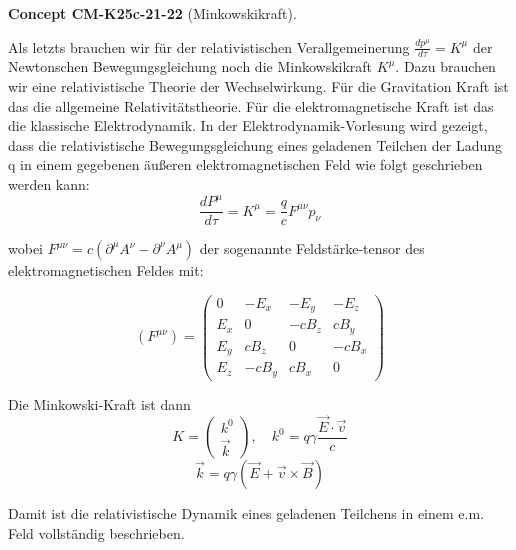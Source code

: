 \documentclass[10pt, letterpaper]{article}
\newcommand{\CustomHeading}[3]{%
  \par\medskip\noindent%
  \textbf{#1 #2} \textnormal{(#3)}.\enskip%
}
\newenvironment{CONC}[2]{\begin{unitbox}\CustomHeading{Concept}{#1}{#2}}{\end{unitbox}}
\begin{document}
\begin{CONC}{CM-K25c-21-22}{Minkowskikraft}
Als letzts brauchen wir für der relativistischen Verallgemeinerung $\frac{dp^\mu}{d\tau} = K^\mu$ der Newtonschen Bewegungsgleichung noch die Minkowskikraft $K^\mu$. Dazu brauchen wir eine relativistische Theorie der Wechselwirkung. Für die Gravitation Kraft ist das die allgemeine Relativitätstheorie. Für die elektromagnetische Kraft ist das die klassische Elektrodynamik. In der Elektrodynamik-Vorlesung wird gezeigt, dass die relativistische Bewegungsgleichung eines geladenen Teilchen der Ladung q in einem gegebenen äußeren elektromagnetischen Feld wie folgt geschrieben werden kann:
\[\frac{dP^\mu}{d\tau} = K^\mu = \frac{q}{c}F^{\mu\nu}p_\nu\]

wobei $F^{\mu\nu} = c(\partial^\mu A^\nu - \partial^\nu A^\mu)$ der sogenannte Feldstärke-tensor des elektromagnetischen Feldes mit:

\[(F^{\mu\nu}) = \begin{pmatrix}
0 & -E_x & -E_y & -E_z \\
E_x & 0 & -cB_z & cB_y \\
E_y & cB_z & 0 & -cB_x \\
E_z & -cB_y & cB_x & 0
\end{pmatrix}\]

Die Minkowski-Kraft ist dann
\[K = \begin{pmatrix} k^0 \\ \vec{k} \end{pmatrix}, \quad k^0 = q\gamma \frac{\vec{E}\cdot\vec{v}}{c}\]
\[\vec{k} = q\gamma(\vec{E} + \vec{v}\times\vec{B})\]

Damit ist die relativistische Dynamik eines geladenen Teilchens in einem e.m. Feld vollständig beschrieben.
\end{CONC}


\printbibliography
\end{document}
